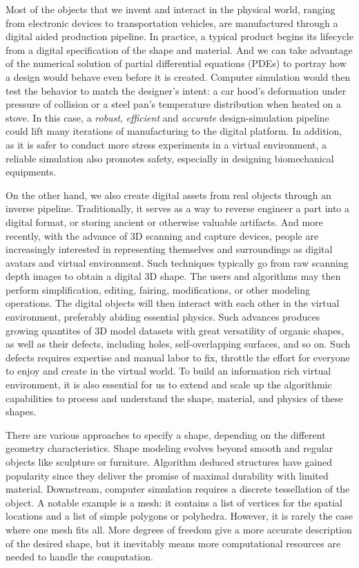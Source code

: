 Most of the objects that we invent and interact in the physical world, ranging from electronic devices to transportation vehicles, are manufactured through a digital aided production pipeline.
In practice, a typical product begins its lifecycle from a digital specification of the shape and material. 
And we can take advantage of the numerical solution of partial differential equations (PDEs) to portray how a design would behave even before it is created. 
Computer simulation would then test the behavior to match the designer's intent: a car hood's deformation under pressure of collision or a steel pan's temperature distribution when heated on a stove. In this case, a \emph{robust}, \emph{efficient} and \emph{accurate} design-simulation pipeline could lift many iterations of manufacturing to the digital platform. In addition, as it is safer to conduct more stress experiments in a virtual environment, a reliable simulation also promotes safety, especially in designing biomechanical equipments. 

On the other hand, we also create digital assets from real objects through an inverse pipeline. Traditionally, it serves as a way to reverse engineer a part into a digital format, or storing ancient or otherwise valuable artifacts. And more recently, with the advance of 3D scanning and capture devices, people are increasingly interested in representing themselves and surroundings as digital avatars and virtual environment. Such techniques typically go from raw scanning depth images to obtain a digital 3D shape. The users and algorithms may then perform simplification, editing, fairing, modifications, or other modeling operations. The digital objects will then interact with each other in the virtual environment, preferably abiding essential physics.
Such advances produces growing quantites of 3D model datasets with great versatility of organic shapes, as well as their defects, including holes, self-overlapping surfaces, and so on. Such defects requires expertise and manual labor to fix, throttle the effort for everyone to enjoy and create in the virtual world. To build an information rich virtual environment, it is also essential for us to extend and scale up the algorithmic capabilities to process and understand the shape, material, and physics of these shapes.

There are various approaches to specify a shape, depending on the different geometry characteristics. Shape modeling evolves beyond smooth and regular objects like sculpture or furniture. Algorithm deduced structures have gained popularity since they deliver the promise of maximal durability with limited material. Downstream, computer simulation requires a discrete tessellation of the object. A notable example is a mesh: it contains a list of vertices for the spatial locations and a list of simple polygons or polyhedra. However, it is rarely the case where one mesh fits all. More degrees of freedom give a more accurate description of the desired shape, but it inevitably means more computational resources are needed to handle the computation.

